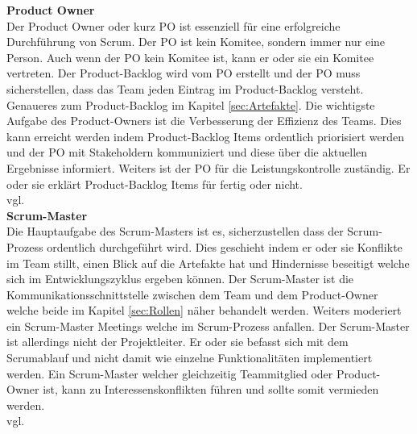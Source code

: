 			\textbf{Product Owner} \\
			Der Product Owner oder kurz PO ist essenziell für eine erfolgreiche Durchführung von Scrum. Der PO ist kein Komitee, sondern immer nur eine Person. Auch wenn der PO kein Komitee ist, kann er oder sie ein Komitee vertreten. Der Product-Backlog wird vom PO erstellt und der PO muss sicherstellen, dass das Team jeden Eintrag im Product-Backlog versteht. Genaueres zum Product-Backlog im Kapitel \ref{sec:Artefakte}. Die wichtigste Aufgabe des Product-Owners ist die Verbesserung der Effizienz des Teams. Dies kann erreicht werden indem Product-Backlog Items ordentlich priorisiert werden und der PO mit Stakeholdern kommuniziert und diese über die aktuellen Ergebnisse informiert. Weiters ist der PO für die Leistungskontrolle zuständig. Er oder sie erklärt Product-Backlog Items für fertig oder nicht.\\vgl. \textcite{ScrumProductOwner} \\ 
			
			\textbf{Scrum-Master} \\
			Die Hauptaufgabe des Scrum-Masters ist es, sicherzustellen dass der Scrum-Prozess ordentlich durchgeführt wird. Dies geschieht indem er oder sie Konflikte im Team stillt, einen Blick auf die Artefakte hat und Hindernisse beseitigt welche sich im Entwicklungszyklus ergeben können. Der Scrum-Master ist die Kommunikationsschnittstelle zwischen dem Team und dem Product-Owner welche beide im Kapitel \ref{sec:Rollen} näher behandelt werden. Weiters moderiert ein Scrum-Master Meetings welche im Scrum-Prozess anfallen. Der Scrum-Master ist allerdings nicht der Projektleiter. Er oder sie befasst sich mit dem Scrumablauf und nicht damit wie einzelne Funktionalitäten implementiert werden. Ein Scrum-Master welcher gleichzeitig Teammitglied oder Product-Owner ist, kann zu Interessenskonflikten führen und sollte somit vermieden werden.\\vgl. \textcite{ScrumScrumMaster} \\
			
